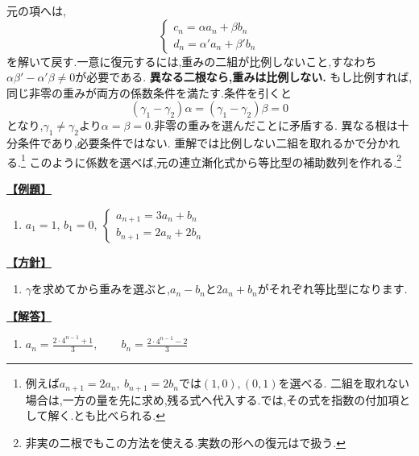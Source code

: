     元の項へは,
    \[
      \begin{cases}
        c_n=\alpha a_n+\beta b_n\\
        d_n=\alpha'a_n+\beta'b_n
      \end{cases}
    \]
    を解いて戻す.一意に復元するには,重みの二組が比例しないこと,すなわち$\alpha\beta'-\alpha'\beta\ne0$が必要である.
    \textbf{異なる二根なら,重みは比例しない.}
    もし比例すれば,同じ非零の重みが両方の係数条件を満たす.条件を引くと
    \[
      (\gamma_1-\gamma_2)\alpha=(\gamma_1-\gamma_2)\beta=0
    \]
    となり,$\gamma_1\ne\gamma_2$より$\alpha=\beta=0$.非零の重みを選んだことに矛盾する.
    異なる根は十分条件であり,必要条件ではない.
    重解では比例しない二組を取れるかで分かれる.\footnote{例えば$a_{n+1}=2a_n,\ b_{n+1}=2b_n$では$(1,0),(0,1)$を選べる.
    二組を取れない場合は,一方の量を先に求め,残る式へ代入する.では,その式を指数の付加項として解く.とも比べられる.}
    このように係数を選べば,元の連立漸化式から等比型の補助数列を作れる.\footnote{非実の二根でもこの方法を使える.実数の形への復元はで扱う.}

    \noindent \hyperlink{book:example-system-1:answer:2}{\textbf{【例題】}}\par\nobreak
    \begin{enumerate}[start=2,label=(\arabic*),parsep=3pt,format=\bookitemlink{example-system-1}{problem}{answer}]
      \item $\displaystyle a_1=1,\,b_1=0,\ \begin{cases}a_{n+1}=3a_n+b_n\\ b_{n+1}=2a_n+2b_n\end{cases}$
    \end{enumerate}

    \noindent \hyperlink{book:example-system-1:problem:2}{\textbf{【方針】}}\par\nobreak
    \begin{enumerate}[start=2,label=(\arabic*),parsep=3pt,format=\bookitemlink{example-system-1}{hint}{problem}]
      \item $\gamma$を求めてから重みを選ぶと,$a_n-b_n$と$2a_n+b_n$がそれぞれ等比型になります.
    \end{enumerate}

    \noindent \hyperlink{book:example-system-1:problem:2}{\textbf{【解答】}}\par\nobreak
    \begin{enumerate}[start=2,label=(\arabic*),parsep=3pt,format=\bookitemlink{example-system-1}{answer}{problem}]
      \item $\displaystyle a_n=\frac{2\cdot4^{n-1}+1}{3},\qquad b_n=\frac{2\cdot4^{n-1}-2}{3}$
    \end{enumerate}

